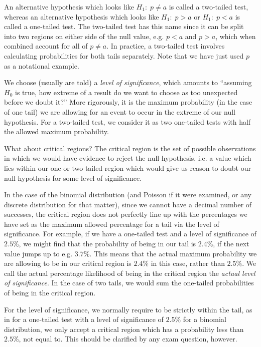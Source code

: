 An alternative hypothesis which looks like $H_1:\;p\neq a$ is called a two-tailed test, whereas an alternative hypothesis which looks like $H_1:\;p>a$ or $H_1:\; p<a$ is called a one-tailed test. 
The two-tailed test has this name since it can be split into two regions on either side of the null value, e.g. $p<a$ and $p>a$, which when combined account for all of $p\neq a$. In practice, a two-tailed test involves calculating probabilities for both tails separately. Note that we have just used $p$ as a notational example.

We choose (usually are told) a \emph{level of significance}, which amounts to ``assuming $H_0$ is true, how extreme of a result do we want to choose as too unexpected before we doubt it?'' 
More rigorously, it is the maximum probability (in the case of one tail) we are allowing for an event to occur in the extreme of our null hypothesis. For a two-tailed test, we consider it as two one-tailed tests with half the allowed maximum probability.

What about critical regions? The critical region is the set of possible observations in which we would have evidence to reject the null hypothesis, i.e. a value which lies within our one or two-tailed region which would give us reason to doubt our null hypothesis for some level of significance.

In the case of the binomial distribution (and Poisson if it were examined, or any discrete distribution for that matter), since we cannot have a decimal number of successes, the critical region does not perfectly line up with the percentages we have set as the maximum allowed percentage for a tail via the level of significance. 
For example, if we have a one-tailed test and a level of significance of $2.5\%$, we might find that the probability of being in our tail is  $2.4\%$, if the next value jumps up to e.g. $3.7\%$. This means that the actual maximum probability we are allowing to be in our critical region is $2.4 \%$ in this case, rather than $2.5 \%$. 
We call the actual percentage likelihood of being in the critical region the \emph{actual level of significance}. In the case of two tails, we would sum the one-tailed probabilities of being in the critical region.

For the level of significance, we normally require to be strictly within the tail, as in for a one-tailed test with a level of significance of $2.5\%$ for a binomial distribution, we only accept a critical region which has a probability less than $2.5 \%$, not equal to. This should be clarified by any exam question, however.


